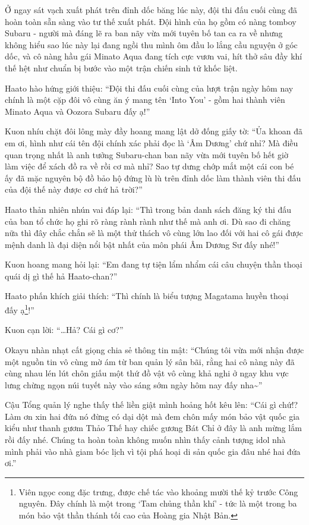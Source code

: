 \documentclass[../main.tex]{subfiles}
\begin{document}
Ở ngay sát vạch xuất phát trên đỉnh dốc băng lúc này, đội thi đấu cuối cùng đã hoàn toàn sẵn sàng vào tư thế xuất phát. Đội hình của họ gồm có nàng tomboy Subaru - người mà đáng lẽ ra ban nãy vừa mới tuyên bố tan ca ra về nhưng không hiểu sao lúc này lại đang ngồi thu mình ôm đầu lo lắng cầu nguyện ở góc dốc, và cô nàng hầu gái Minato Aqua đang tích cực vươn vai, hít thở sâu đầy khí thế hệt như chuẩn bị bước vào một trận chiến sinh tử khốc liệt.


Haato hào hứng giới thiệu: ``Đội thi đấu cuối cùng của lượt trận ngày hôm nay chính là một cặp đôi vô cùng ăn ý mang tên `Into You' - gồm hai thành viên Minato Aqua và Oozora Subaru đấy ạ!''

Kuon nhíu chặt đôi lông mày đầy hoang mang lật dở đống giấy tờ: ``Ủa khoan đã em ơi, hình như cái tên đội chính xác phải đọc là `Âm Dương' chứ nhỉ? Mà điều quan trọng nhất là anh tưởng Subaru-chan ban nãy vừa mới tuyên bố hết giờ làm việc để xách đồ ra về rồi cơ mà nhỉ? Sao tự dưng chớp mắt một cái con bé ấy đã mặc nguyên bộ đồ bảo hộ đứng lù lù trên đỉnh dốc làm thành viên thi đấu của đội thế này được cơ chứ hả trời?''

Haato thản nhiên nhún vai đáp lại: ``Thì trong bản danh sách đăng ký thi đấu của ban tổ chức họ ghi rõ ràng rành rành như thế mà anh ơi. Dù sao đi chăng nữa thì đây chắc chắn sẽ là một thử thách vô cùng lớn lao đối với hai cô gái được mệnh danh là đại diện nổi bật nhất của môn phái Âm Dương Sư đấy nhé!''

Kuon hoang mang hỏi lại: ``Em đang tự tiện lẩm nhẩm cái câu chuyện thần thoại quái dị gì thế hả Haato-chan?''

Haato phấn khích giải thích: ``Thì chính là biểu tượng Magatama huyền thoại đấy ạ\footnote{Viên ngọc cong đặc trưng, được chế tác vào khoảng mười thế kỷ trước Công nguyên. Đây chính là một trong `Tam chủng thần khí' - tức là một trong ba món bảo vật thần thánh tối cao của Hoàng gia Nhật Bản.}!''

Kuon cạn lời: ``\dots Hả? Cái gì cơ?''

Okayu nhàn nhạt cất giọng chia sẻ thông tin mật: ``Chúng tôi vừa mới nhận được một nguồn tin vô cùng mờ ám từ ban quản lý sân bãi, rằng hai cô nàng này đã cùng nhau lén lút chôn giấu một thứ đồ vật vô cùng khả nghi ở ngay khu vực lưng chừng ngọn núi tuyết này vào sáng sớm ngày hôm nay đấy nha\~{}''

Cậu Tổng quản lý nghe thấy thế liền giật mình hoảng hốt kêu lên: ``Cái gì chứ!? Làm ơn xin hai đứa nó đừng có dại dột mà đem chôn mấy món bảo vật quốc gia kiểu như thanh gươm Thảo Thế hay chiếc gương Bát Chỉ ở đây là anh mừng lắm rồi đấy nhé. Chúng ta hoàn toàn không muốn nhìn thấy cảnh tượng idol nhà mình phải vào nhà giam bóc lịch vì tội phá hoại di sản quốc gia đâu nhé hai đứa ơi.''
\end{document}
